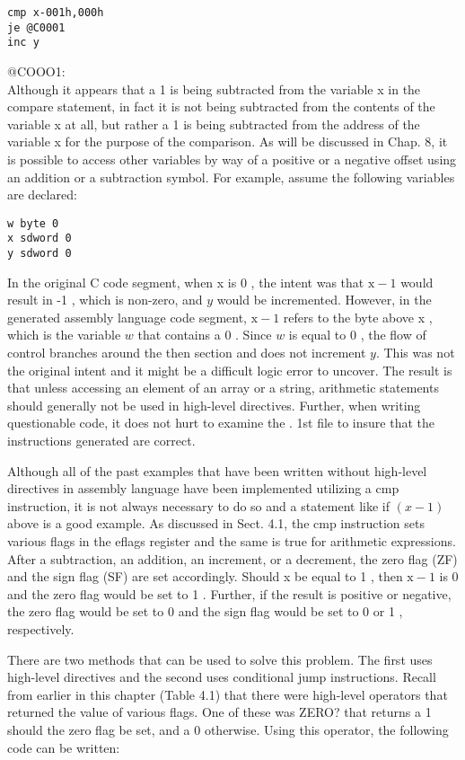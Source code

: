 \documentclass[10pt]{article}
\begin{document}
\begin{verbatim}
cmp x-001h,000h
je @C0001
inc y
\end{verbatim}

@COOO1:\\
Although it appears that a 1 is being subtracted from the variable x in the compare statement, in fact it is not being subtracted from the contents of the variable x at all, but rather a 1 is being subtracted from the address of the variable x for the purpose of the comparison. As will be discussed in Chap. 8, it is possible to access other variables by way of a positive or a negative offset using an addition or a subtraction symbol. For example, assume the following variables are declared:

\begin{verbatim}
w byte 0
x sdword 0
y sdword 0
\end{verbatim}

In the original C code segment, when x is 0 , the intent was that $\mathrm{x}-1$ would result in -1 , which is non-zero, and $y$ would be incremented. However, in the generated assembly language code segment, $\mathrm{x}-1$ refers to the byte above x , which is the variable $w$ that contains a 0 . Since $w$ is equal to 0 , the flow of control branches around the then section and does not increment $y$. This was not the original intent and it might be a difficult logic error to uncover. The result is that unless accessing an element of an array or a string, arithmetic statements should generally not be used in high-level directives. Further, when writing questionable code, it does not hurt to examine the . 1st file to insure that the instructions generated are correct.

Although all of the past examples that have been written without high-level directives in assembly language have been implemented utilizing a cmp instruction, it is not always necessary to do so and a statement like if $(x-1)$ above is a good example. As discussed in Sect. 4.1, the cmp instruction sets various flags in the eflags register and the same is true for arithmetic expressions. After a subtraction, an addition, an increment, or a decrement, the zero flag (ZF) and the sign flag (SF) are set accordingly. Should x be equal to 1 , then $\mathrm{x}-1$ is 0 and the zero flag would be set to 1 . Further, if the result is positive or negative, the zero flag would be set to 0 and the sign flag would be set to 0 or 1 , respectively.

There are two methods that can be used to solve this problem. The first uses high-level directives and the second uses conditional jump instructions. Recall from earlier in this chapter (Table 4.1) that there were high-level operators that returned the value of various flags. One of these was ZERO? that returns a 1 should the zero flag be set, and a 0 otherwise. Using this operator, the following code can be written:
\end{document}
